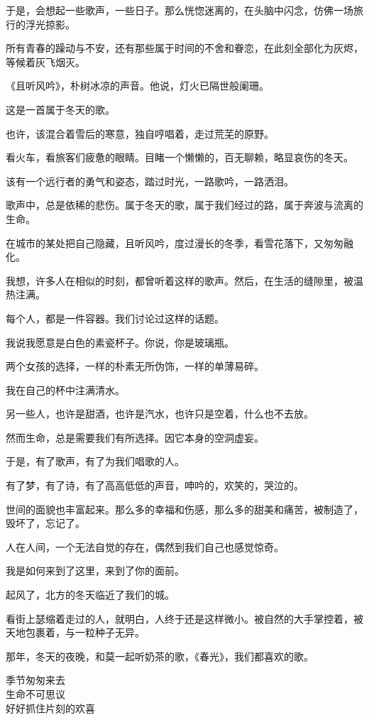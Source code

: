 \documentclass[12pt,a4paper]{article}
\begin{document}
		于是，会想起一些歌声，一些日子。那么恍惚迷离的，在头脑中闪念，仿佛一场旅行的浮光掠影。\par
		所有青春的躁动与不安，还有那些属于时间的不舍和眷恋，在此刻全部化为灰烬，等候着灰飞烟灭。\par
		《且听风吟》，朴树冰凉的声音。他说，灯火已隔世般阑珊。\par
		这是一首属于冬天的歌。\par
		也许，该混合着雪后的寒意，独自哼唱着，走过荒芜的原野。\par
		看火车，看旅客们疲惫的眼睛。目睹一个懒懒的，百无聊赖，略显哀伤的冬天。\par
		该有一个远行者的勇气和姿态，踏过时光，一路歌吟，一路洒泪。\par
		歌声中，总是依稀的悲伤。属于冬天的歌，属于我们经过的路，属于奔波与流离的生命。\par
		在城市的某处把自己隐藏，且听风吟，度过漫长的冬季，看雪花落下，又匆匆融化。

		我想，许多人在相似的时刻，都曾听着这样的歌声。然后，在生活的缝隙里，被温热注满。\par
		每个人，都是一件容器。我们讨论过这样的话题。\par
		我说我愿意是白色的素瓷杯子。你说，你是玻璃瓶。\par
		两个女孩的选择，一样的朴素无所伪饰，一样的单薄易碎。\par
		我在自己的杯中注满清水。\par
		另一些人，也许是甜酒，也许是汽水，也许只是空着，什么也不去放。\par
		然而生命，总是需要我们有所选择。因它本身的空洞虚妄。\par
		于是，有了歌声，有了为我们唱歌的人。\par
		有了梦，有了诗，有了高高低低的声音，呻吟的，欢笑的，哭泣的。\par
		世间的面貌也丰富起来。那么多的幸福和伤感，那么多的甜美和痛苦，被制造了，毁坏了，忘记了。\par
		人在人间，一个无法自觉的存在，偶然到我们自己也感觉惊奇。\par
		我是如何来到了这里，来到了你的面前。

		起风了，北方的冬天临近了我们的城。\par
		看街上瑟缩着走过的人，就明白，人终于还是这样微小。被自然的大手掌控着，被天地包裹着，与一粒种子无异。\par
		那年，冬天的夜晚，和莫一起听奶茶的歌，《春光》，我们都喜欢的歌。

		\longpoem{}{}{}
		季节匆匆来去 \\
		生命不可思议 \\
		好好抓住片刻的欢喜
		\endlongpoem
\end{document}
